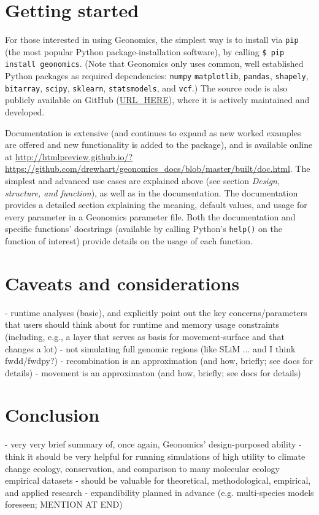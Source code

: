 ﻿\documentclass{article}
\begin{document}
\section{Getting started}
For those interested in using Geonomics, the simplest way is to install
via \texttt{pip} (the most popular Python package-installation software),
by calling \texttt{\$ pip install geonomics}.
(Note that Geonomics only uses common, well established Python packages
as required dependencies: \texttt{numpy} \texttt{matplotlib},
\texttt{pandas}, \texttt{shapely}, \texttt{bitarray},
\texttt{scipy}, \texttt{sklearn}, \texttt{statsmodels}, and \texttt{vcf}.)
The source code is also publicly available on GitHub (\url{URL\_HERE}),
where it is actively maintained and developed.

Documentation is extensive (and continues to expand as new worked examples
are offered and new functionality is added to the package), and is available
online at \url{http://htmlpreview.github.io/?https://github.com/drewhart/geonomics\_docs/blob/master/built/doc.html}.  
The simplest and advanced use cases are explained above (see section
\emph{Design, structure, and function}), as well as in the documentation.
The documentation provides a detailed section explaining the meaning,
default values, and usage for every parameter in a Geonomics parameter
file.
Both the documentation and specific functions' docstrings (available
by calling Python's \texttt{help()} on the function of interest) provide
details on the usage of each function.

\section{Caveats and considerations}
- runtime analyses (basic), and explicitly point out the key concerns/parameters
that users should think about for runtime and memory usage constraints (including, e.g.,
a layer that serves as basis for movement-surface and that changes a lot)
- not simulating full genomic regions (like SLiM ... and I think fwdd/fwdpy?)
- recombination is an approximation (and how, briefly; see docs for details)
- movement is an approximaton (and how, briefly; see docs for details)

\section {Conclusion}
- very very brief summary of, once again, Geonomics' design-purposed ability
- think it should be very helpful for running simulations of high utility to
  climate change ecology, conservation, and comparison to many molecular ecology
  empirical datasets
- should be valuable for theoretical, methodological, empirical, and applied research
- expandibility planned in advance (e.g. multi-species models foreseen; MENTION AT END)
\end{document}
